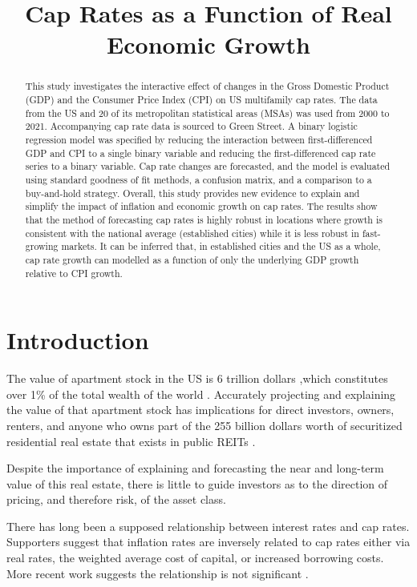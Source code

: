\title{Cap Rates as a Function of Real Economic Growth}
\begin{abstract} 

This study investigates the interactive effect of changes in the Gross Domestic Product (GDP) and the Consumer Price Index (CPI) on US multifamily cap rates. The data from the US and 20 of its metropolitan statistical areas (MSAs) was used from 2000 to 2021. Accompanying cap rate data is sourced to Green Street. A binary logistic regression model was specified by reducing the interaction between first-differenced GDP and CPI to a single binary variable and reducing the first-differenced cap rate series to a binary variable. Cap rate changes are forecasted, and the model is evaluated using standard goodness of fit methods, a confusion matrix, and a comparison to a buy-and-hold strategy.  Overall, this study provides new evidence to explain and simplify the impact of inflation and economic growth on cap rates. The results show that the method of forecasting cap rates is highly robust in locations where growth is consistent with the national average (established cities) while it is less robust in fast-growing markets. It can be inferred that, in established cities and the US as a whole, cap rate growth can modelled as a function of only the underlying GDP growth relative to CPI growth.

\end{abstract}



\section{Introduction}
The value of apartment stock in the US is 6 trillion dollars \citep*{nmhc},which constitutes over 1\% of the total wealth of the world \citep*{williams_2021}. Accurately projecting and explaining the value of that apartment stock has implications for direct investors, owners, renters, and anyone who owns part of the 255 billion dollars worth of securitized residential real estate that exists in public REITs \citep*{nareit_2022}. 

Despite the importance of explaining and forecasting the near and long-term value of this real estate, there is little to guide investors as to the direction of pricing, and therefore risk, of the asset class.

There has long been a supposed relationship between interest rates and cap rates\citep*{froland1987determines, sivitanides2001determinants, chandrashekaran2000predictability}. Supporters suggest that inflation rates are inversely related to cap rates either via real rates, the weighted average  cost of capital, or increased borrowing costs. More recent work suggests the relationship is not significant \citep*{larriva2021determinants}. 

